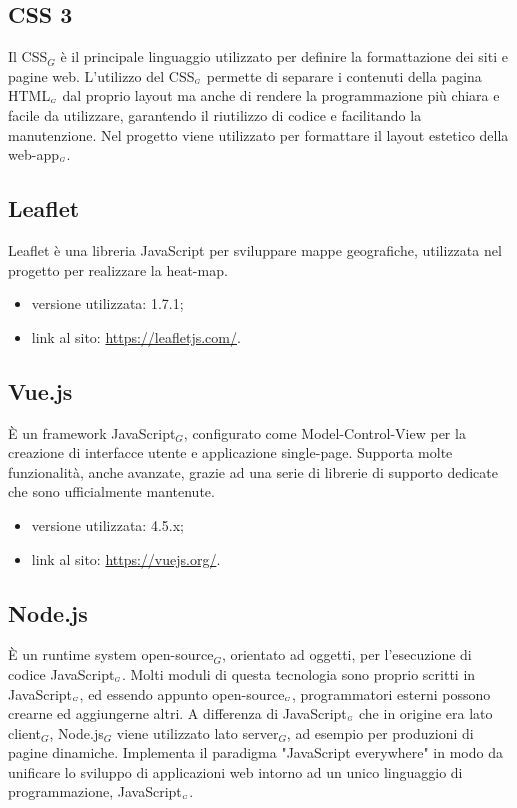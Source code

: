 \subsection{CSS 3}\label{TecnologieCSS}
Il CSS$_G$ è il principale linguaggio utilizzato per definire la formattazione dei siti e pagine web.
L'utilizzo del CSS$_{\scaleto{G}{3pt}}$ permette di separare i contenuti della pagina HTML$_{\scaleto{G}{3pt}}$ dal proprio layout ma anche di rendere la programmazione più chiara e facile da utilizzare, garantendo il riutilizzo di codice e facilitando la manutenzione.
Nel progetto viene utilizzato per formattare il layout estetico della web-app$_{\scaleto{G}{3pt}}$.

\subsection{Leaflet} \label{TecnologieLeaflet}
Leaflet è una libreria JavaScript per sviluppare mappe geografiche, utilizzata nel progetto per realizzare la heat-map.
\begin{itemize}
	\item versione utilizzata: 1.7.1;
	\item link al sito: \url{https://leafletjs.com/}.
\end{itemize}


\subsection{Vue.js}\label{TecnologieVue}
È un framework JavaScript$_G$, configurato come Model-Control-View per la creazione di interfacce utente e applicazione single-page.
Supporta molte funzionalità, anche avanzate, grazie ad una serie di librerie di supporto dedicate che sono ufficialmente mantenute.

\begin{itemize}
  \item versione utilizzata: 4.5.x;
  \item link al sito: \url{https://vuejs.org/}.
\end{itemize}

\subsection{Node.js}\label{TecnologieNode}
È un runtime system open-source$_G$, orientato ad oggetti, per l'esecuzione di codice JavaScript$_{\scaleto{G}{3pt}}$.
Molti moduli di questa tecnologia sono proprio scritti in JavaScript$_{\scaleto{G}{3pt}}$, ed essendo appunto open-source$_{\scaleto{G}{3pt}}$, programmatori esterni possono crearne ed aggiungerne altri.
A differenza di JavaScript$_{\scaleto{G}{3pt}}$ che in origine era lato client$_G$, Node.js$_G$ viene utilizzato lato server$_G$, ad esempio per produzioni di pagine dinamiche.
Implementa il paradigma "JavaScript everywhere" in modo da unificare lo sviluppo di applicazioni web intorno ad un unico linguaggio di programmazione, JavaScript$_{\scaleto{G}{3pt}}$.

